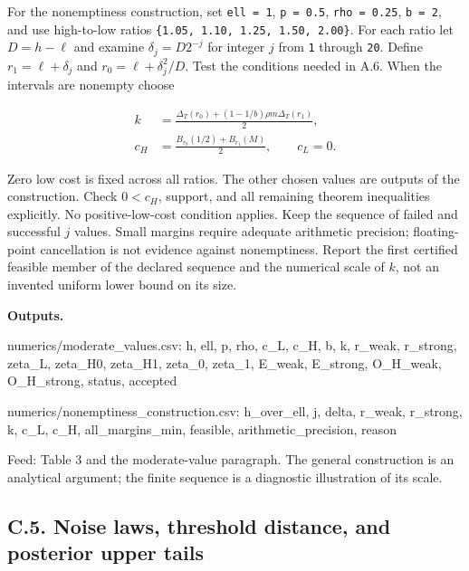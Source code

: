 \documentclass[
  11pt,
]{article}
\newenvironment{Shaded}{}{}
\newcommand{\NormalTok}[1]{#1}
\newcounter{none} %
\begin{document}
For the nonemptiness construction, set \texttt{ell\ =\ 1},
\texttt{p\ =\ 0.5}, \texttt{rho\ =\ 0.25}, \texttt{b\ =\ 2}, and use
high-to-low ratios \texttt{\{1.05,\ 1.10,\ 1.25,\ 1.50,\ 2.00\}}. For
each ratio let \(D=h-\ell\) and examine \(\delta_j=D2^{-j}\) for integer
\(j\) from \texttt{1} through \texttt{20}. Define \(r_1=\ell+\delta_j\)
and \(r_0=\ell+\delta_j^2/D\). Test the conditions needed in A.6. When
the intervals are nonempty choose

\[
\begin{aligned}
k&=\frac{\Delta_T(r_0)+(1-1/b)\rho m\Delta_T(r_1)}2,\\
c_H&=\frac{B_{r_0}(1/2)+B_{r_1}(M)}2,
\qquad c_L=0.
\end{aligned}
\tag{OA.78}\label{eq:oa-oa-78}
\]

Zero low cost is fixed across all ratios. The other chosen values are
outputs of the construction. Check \(0<c_H\), support, and all remaining
theorem inequalities explicitly. No positive-low-cost condition applies.
Keep the sequence of failed and successful \(j\) values. Small margins
require adequate arithmetic precision; floating-point cancellation is
not evidence against nonemptiness. Report the first certified feasible
member of the declared sequence and the numerical scale of \(k\), not an
invented uniform lower bound on its size.

\textbf{Outputs.}

\begin{Shaded}
\begin{Highlighting}[]
\NormalTok{numerics/moderate\_values.csv:}
\NormalTok{h, ell, p, rho, c\_L, c\_H, b, k, r\_weak, r\_strong,}
\NormalTok{zeta\_L, zeta\_H0, zeta\_H1, zeta\_0, zeta\_1,}
\NormalTok{E\_weak, E\_strong, O\_H\_weak, O\_H\_strong, status, accepted}

\NormalTok{numerics/nonemptiness\_construction.csv:}
\NormalTok{h\_over\_ell, j, delta, r\_weak, r\_strong, k, c\_L, c\_H,}
\NormalTok{all\_margins\_min, feasible, arithmetic\_precision, reason}
\end{Highlighting}
\end{Shaded}

Feed: Table 3 and the moderate-value paragraph. The general construction
is an analytical argument; the finite sequence is a diagnostic
illustration of its scale.

\subsection{C.5. Noise laws, threshold distance, and posterior upper
tails}\label{oa-c-noise}
\end{document}
